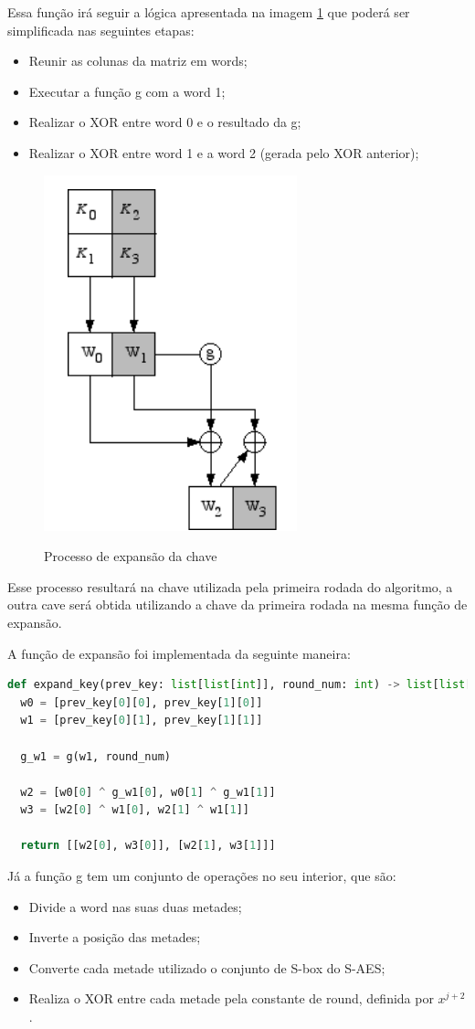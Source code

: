 \documentclass[12pt]{article}
\begin{document}
Essa função irá seguir a lógica apresentada na imagem \ref{fig:Key Expansion} que poderá ser simplificada nas seguintes etapas:
\begin{itemize}
  \item Reunir as colunas da matriz em words;
  \item Executar a função g com a word 1;
  \item Realizar o XOR entre word 0 e o resultado da g;
  \item Realizar o XOR entre word 1 e a word 2 (gerada pelo XOR anterior);
\end{itemize}

\begin{figure}[h]
  \caption{Processo de expansão da chave}
    \centering
    \includegraphics[width = 0.4\linewidth]{Imagens/Key-expansion.png}  
    \label{fig:Key Expansion}
\end{figure}

Esse processo resultará na chave utilizada pela primeira rodada do algoritmo, a outra cave será obtida utilizando a chave da primeira rodada na mesma função de expansão.

A função de expansão foi implementada da seguinte maneira:
\begin{lstlisting}[language=Python]
def expand_key(prev_key: list[list[int]], round_num: int) -> list[list[int]]:
  w0 = [prev_key[0][0], prev_key[1][0]]
  w1 = [prev_key[0][1], prev_key[1][1]]

  g_w1 = g(w1, round_num)

  w2 = [w0[0] ^ g_w1[0], w0[1] ^ g_w1[1]]
  w3 = [w2[0] ^ w1[0], w2[1] ^ w1[1]]

  return [[w2[0], w3[0]], [w2[1], w3[1]]]
\end{lstlisting}

Já a função g tem um conjunto de operações no seu interior, que são:
\begin{itemize}
  \item Divide a word nas suas duas metades;
  \item Inverte a posição das metades;
  \item Converte cada metade utilizado o conjunto de S-box do S-AES;
  \item Realiza o XOR entre cada metade pela constante de round, definida por $x^{j+2}$.
\end{itemize}
\end{document}
